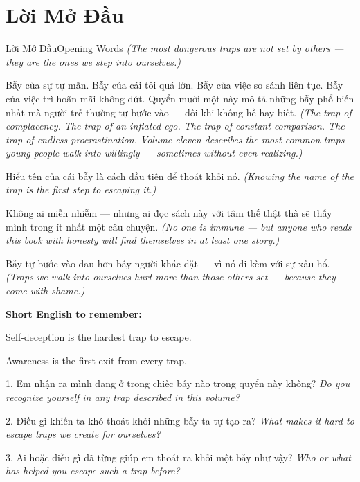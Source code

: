 \chapter*{Lời Mở Đầu}

\begin{truyen}{Lời Mở Đầu}{Opening Words}
\textit{(The most dangerous traps are not set by others --- they are the ones we step into ourselves.)}

Bẫy của sự tự mãn. Bẫy của cái tôi quá lớn. Bẫy của việc so sánh liên tục. Bẫy của việc trì hoãn mãi không dứt. Quyển mười một này mô tả những bẫy phổ biến nhất mà người trẻ thường tự bước vào — đôi khi không hề hay biết.
\textit{(The trap of complacency. The trap of an inflated ego. The trap of constant comparison. The trap of endless procrastination. Volume eleven describes the most common traps young people walk into willingly --- sometimes without even realizing.)}

Hiểu tên của cái bẫy là cách đầu tiên để thoát khỏi nó.
\textit{(Knowing the name of the trap is the first step to escaping it.)}

Không ai miễn nhiễm — nhưng ai đọc sách này với tâm thế thật thà sẽ thấy mình trong ít nhất một câu chuyện.
\textit{(No one is immune --- but anyone who reads this book with honesty will find themselves in at least one story.)}
\end{truyen}

\begin{baihoc}
Bẫy tự bước vào đau hơn bẫy người khác đặt --- vì nó đi kèm với sự xấu hổ.
\textit{(Traps we walk into ourselves hurt more than those others set --- because they come with shame.)}
\end{baihoc}

\begin{ghinhoanh}
\textbf{Short English to remember:}

Self-deception is the hardest trap to escape.

Awareness is the first exit from every trap.
\end{ghinhoanh}

\begin{tuhocnhanh}
1. Em nhận ra mình đang ở trong chiếc bẫy nào trong quyển này không? \textit{Do you recognize yourself in any trap described in this volume?}

2. Điều gì khiến ta khó thoát khỏi những bẫy ta tự tạo ra? \textit{What makes it hard to escape traps we create for ourselves?}

3. Ai hoặc điều gì đã từng giúp em thoát ra khỏi một bẫy như vậy? \textit{Who or what has helped you escape such a trap before?}
\end{tuhocnhanh}

\ngancach
